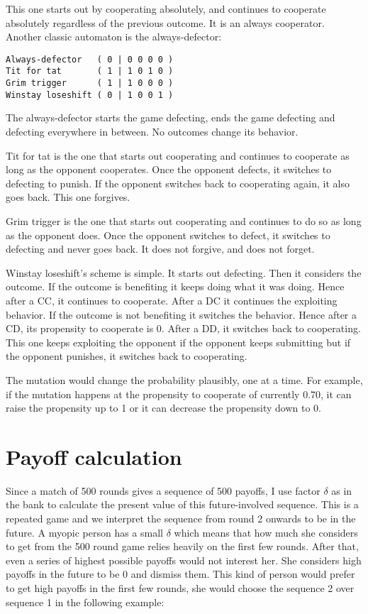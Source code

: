 \documentclass[12.5pt]{report}
\begin{document}
This one starts out by cooperating absolutely, and continues to cooperate absolutely regardless of the previous outcome. It is an always cooperator. Another classic automaton is the always-defector:

\begin{verbatim}
Always-defector   ( 0 | 0 0 0 0 )
Tit for tat       ( 1 | 1 0 1 0 )
Grim trigger      ( 1 | 1 0 0 0 )
Winstay loseshift ( 0 | 1 0 0 1 )
\end{verbatim}

The always-defector starts the game defecting, ends the game defecting and defecting everywhere in between. No outcomes change its behavior.

Tit for tat is the one that starts out cooperating and continues to cooperate as long as the opponent cooperates. Once the opponent defects, it switches to defecting to punish. If the opponent switches back to cooperating again, it also goes back. This one forgives.

Grim trigger is the one that starts out cooperating and continues to do so as long as the opponent does. Once the opponent switches to defect, it switches to defecting and never goes back. It does not forgive, and does not forget.

Winstay loseshift's scheme is simple. It starts out defecting. Then it considers the outcome. If the outcome is benefiting it keeps doing what it was doing. Hence after a CC, it continues to cooperate. After a DC it continues the exploiting behavior. If the outcome is not benefiting it switches the behavior. Hence after a CD, its propensity to cooperate is 0. After a DD, it switches back to cooperating. This one keeps exploiting the opponent if the opponent keeps submitting but if the opponent punishes, it switches back to cooperating.

The mutation would change the probability plausibly, one at a time. For example, if the mutation happens at the propensity to cooperate of currently 0.70, it can raise the propensity up to 1 or it can decrease the propensity down to 0.

\section{Payoff calculation}
Since a match of 500 rounds gives a sequence of 500 payoffs, I use factor $\delta$ as in the bank to calculate the present value of this future-involved sequence. This is a repeated game and we interpret the sequence from round 2 onwards to be in the future. A myopic person has a small $\delta$ which means that how much she considers to get from the 500 round game relies heavily on the first few rounds. After that, even a series of highest possible payoffs would not interest her. She considers high payoffs in the future to be 0 and dismiss them. This kind of person would prefer to get high payoffs in the first few rounds, she would choose the sequence 2 over sequence 1 in the following example:
\end{document}
